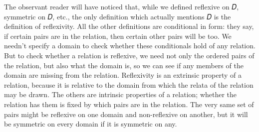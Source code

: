 








The observant reader will have noticed that, while we defined reflexive on 𝐷, symmetric on 𝐷, etc., the only definition which actually mentions 𝐷 is the definition of reflexivity. All the other definitions are conditional in form: they say, if certain pairs are in the relation, then certain other pairs will be too. We needn’t specify a domain to check whether these conditionals hold of any relation. But to check whether a relation is reflexive, we need not only the ordered pairs of the relation, but also what the domain is, so we can see if any members of the domain are missing from the relation. Reflexivity is an extrinsic property of a relation, because it is relative to the domain from which the relata of the relation may be drawn. The others are intrinsic properties of a relation; whether the relation has them is fixed by which pairs are in the relation. The very same set of pairs might be reflexive on one domain and non-reflexive on another, but it will be symmetric on every domain if it is symmetric on any.




